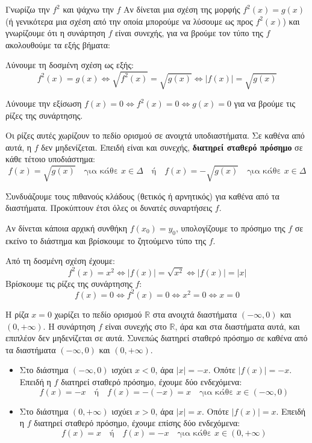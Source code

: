 \begin{askhsh}{Γνωρίζω την $f^2$ και ψάχνω την $f$}
Αν δίνεται μια σχέση της μορφής $f^2(x) = g(x)$ (ή γενικότερα μια σχέση από την οποία μπορούμε να λύσουμε ως προς $f^2(x)$) και γνωρίζουμε ότι η συνάρτηση $f$ είναι συνεχής, για να βρούμε τον τύπο της $f$ ακολουθούμε τα εξής βήματα:

\bhmata
\begin{bhma}
\item Λύνουμε τη δοσμένη σχέση ως εξής:
\[f^2(x)=g(x)\Leftrightarrow \sqrt{f^2(x)}=\sqrt{g(x)}\Leftrightarrow |f(x)|=\sqrt{g(x)}\]
\item Λύνουμε την εξίσωση $f(x) = 0 \Leftrightarrow f^2(x) = 0 \Leftrightarrow g(x) = 0$ για να βρούμε τις ρίζες της συνάρτησης.
\item Οι ρίζες αυτές χωρίζουν το πεδίο ορισμού σε ανοιχτά υποδιαστήματα. Σε καθένα από αυτά, η $f$ δεν μηδενίζεται. Επειδή είναι και συνεχής, \textbf{διατηρεί σταθερό πρόσημο} σε κάθε τέτοιο υποδιάστημα:
\[ f(x) = \sqrt{g(x)} \quad \text{για κάθε } x \in \Delta \quad \text{ή} \quad f(x) = -\sqrt{g(x)} \quad \text{για κάθε } x \in \Delta \]
\item Συνδυάζουμε τους πιθανούς κλάδους (θετικός ή αρνητικός) για καθένα από τα διαστήματα. Προκύπτουν έτσι όλες οι δυνατές συναρτήσεις $f$.
\item Αν δίνεται κάποια αρχική συνθήκη $f(x_0) = y_0$, υπολογίζουμε το πρόσημο της $f$ σε εκείνο το διάστημα και βρίσκουμε το ζητούμενο τύπο της $f$.
\end{bhma}
\end{askhsh}


\lysh
Από τη δοσμένη σχέση έχουμε:
\[ f^2(x) = x^2 \Leftrightarrow |f(x)| = \sqrt{x^2} \Leftrightarrow |f(x)| = |x| \]
Βρίσκουμε τις ρίζες της συνάρτησης $f$:
\[ f(x) = 0 \Leftrightarrow f^2(x) = 0 \Leftrightarrow x^2 = 0 \Leftrightarrow x = 0 \]

Η ρίζα $x=0$ χωρίζει το πεδίο ορισμού $\mathbb{R}$ στα ανοιχτά διαστήματα $(-\infty, 0)$ και $(0, +\infty)$. Η συνάρτηση $f$ είναι συνεχής στο $\mathbb{R}$, άρα και στα διαστήματα αυτά, και επιπλέον δεν μηδενίζεται σε αυτά. Συνεπώς διατηρεί σταθερό πρόσημο σε καθένα από τα διαστήματα $(-\infty, 0)$ και $(0, +\infty)$. 
\begin{itemize}
    \item Στο διάστημα $(-\infty, 0)$ ισχύει $x < 0$, άρα $|x| = -x$. Οπότε $|f(x)| = -x$.
    Επειδή η $f$ διατηρεί σταθερό πρόσημο, έχουμε δύο ενδεχόμενα:
    \[ f(x) = -x \quad \text{ή} \quad f(x) = -(-x) = x \quad \text{για κάθε } x \in (-\infty, 0) \]
    \item Στο διάστημα $(0, +\infty)$ ισχύει $x > 0$, άρα $|x| = x$. Οπότε $|f(x)| = x$.
    Επειδή η $f$ διατηρεί σταθερό πρόσημο, έχουμε επίσης δύο ενδεχόμενα:
    \[ f(x) = x \quad \text{ή} \quad f(x) = -x \quad \text{για κάθε } x \in (0, +\infty) \]
\end{itemize}

